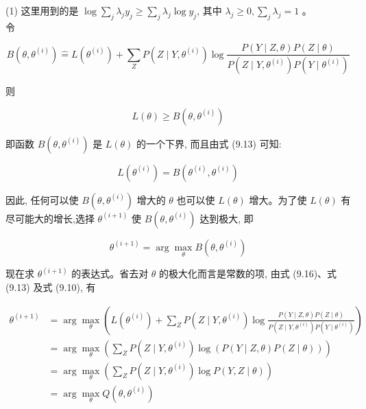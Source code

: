 \documentclass[10pt]{article}
\begin{document}
(1) 这里用到的是 $\log \sum_{j} \lambda_{j} y_{j} \geqslant \sum_{j} \lambda_{j} \log y_{j}$, 其中 $\lambda_{j} \geqslant 0, \sum_{j} \lambda_{j}=1$ 。\\
令


\begin{equation*}
B\left(\theta, \theta^{(i)}\right) \hat{=} L\left(\theta^{(i)}\right)+\sum_{Z} P\left(Z \mid Y, \theta^{(i)}\right) \log \frac{P(Y \mid Z, \theta) P(Z \mid \theta)}{P\left(Z \mid Y, \theta^{(i)}\right) P\left(Y \mid \theta^{(i)}\right)} \tag{9.13}
\end{equation*}


则


\begin{equation*}
L(\theta) \geqslant B\left(\theta, \theta^{(i)}\right) \tag{9.14}
\end{equation*}


即函数 $B\left(\theta, \theta^{(i)}\right)$ 是 $L(\theta)$ 的一个下界, 而且由式 (9.13) 可知:


\begin{equation*}
L\left(\theta^{(i)}\right)=B\left(\theta^{(i)}, \theta^{(i)}\right) \tag{9.15}
\end{equation*}


因此, 任何可以使 $B\left(\theta, \theta^{(i)}\right)$ 增大的 $\theta$ 也可以使 $L(\theta)$ 增大。为了使 $L(\theta)$ 有尽可能大的增长,选择 $\theta^{(i+1)}$ 使 $B\left(\theta, \theta^{(i)}\right)$ 达到极大, 即


\begin{equation*}
\theta^{(i+1)}=\arg \max _{\theta} B\left(\theta, \theta^{(i)}\right) \tag{9.16}
\end{equation*}


现在求 $\theta^{(i+1)}$ 的表达式。省去对 $\theta$ 的极大化而言是常数的项, 由式 (9.16)、式 (9.13) 及式 (9.10), 有


\begin{align*}
\theta^{(i+1)} & =\arg \max _{\theta}\left(L\left(\theta^{(i)}\right)+\sum_{Z} P\left(Z \mid Y, \theta^{(i)}\right) \log \frac{P(Y \mid Z, \theta) P(Z \mid \theta)}{P\left(Z \mid Y, \theta^{(i)}\right) P\left(Y \mid \theta^{(i)}\right)}\right) \\
& =\arg \max _{\theta}\left(\sum_{Z} P\left(Z \mid Y, \theta^{(i)}\right) \log (P(Y \mid Z, \theta) P(Z \mid \theta))\right) \\
& =\arg \max _{\theta}\left(\sum_{Z} P\left(Z \mid Y, \theta^{(i)}\right) \log P(Y, Z \mid \theta)\right) \\
& =\arg \max _{\theta} Q\left(\theta, \theta^{(i)}\right) \tag{9.17}
\end{align*}
\end{document}
